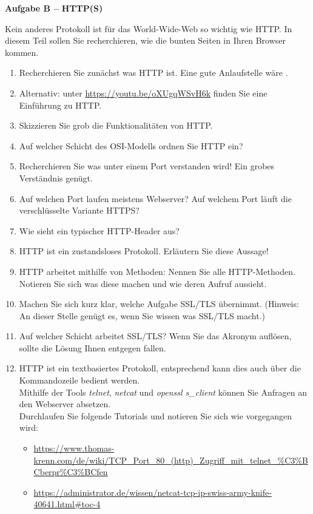 \documentclass[paper=a4,fontsize=11pt]{scrartcl}%
\numberwithin{equation}{section}
\begin{document}
\begin{center}\Large{\textbf{Aufgabe B -- HTTP(S)}}\end{center}\vskip0.25in
Kein anderes Protokoll ist für das World-Wide-Web so wichtig wie HTTP. In diesem Teil sollen Sie recherchieren, wie die bunten Seiten in Ihren Browser kommen.
\begin{enumerate}
	\item Recherchieren Sie zunächst was HTTP ist. Eine gute Anlaufstelle wäre \cite[S. 98ff]{Kurose2012}.
	\item Alternativ: unter \url{https://youtu.be/oXUgqWSvH6k} finden Sie eine Einführung zu HTTP.
	\item Skizzieren Sie grob die Funktionalitäten von HTTP.
	\item Auf welcher Schicht des OSI-Modells ordnen Sie HTTP ein?
	\item Recherchieren Sie was unter einem Port verstanden wird! Ein grobes Verständnis genügt.
	\item Auf welchen Port laufen meistens Webserver? Auf welchem Port läuft die verschlüsselte Variante HTTPS?
	\item Wie sieht ein typischer HTTP-Header aus?
	\item HTTP ist ein zustandsloses Protokoll. Erläutern Sie diese Aussage!
	\item HTTP arbeitet mithilfe von Methoden: Nennen Sie alle HTTP-Methoden. Notieren Sie sich was diese machen und wie deren Aufruf aussieht.
	\item Machen Sie sich kurz klar, welche Aufgabe SSL/TLS übernimmt. (Hinweis: An dieser Stelle genügt es, wenn Sie wissen was SSL/TLS macht.)
	\item Auf welcher Schicht arbeitet SSL/TLS? Wenn Sie das Akronym auflösen, sollte die Lösung Ihnen entgegen fallen.
	\item HTTP ist ein textbasiertes Protokoll, entsprechend kann dies auch über die Kommandozeile bedient werden.\\
	Mithilfe der Tools \emph{telnet}, \emph{netcat} und \emph{openssl s\_client} können Sie Anfragen an den Webserver absetzen.\\
	Durchlaufen Sie folgende Tutorials und notieren Sie sich wie vorgegangen wird:
	\begin{itemize}
		\item \url{https://www.thomas-krenn.com/de/wiki/TCP_Port_80_(http)_Zugriff_mit_telnet_%C3%BCberpr%C3%BCfen}
		\item \url{https://administrator.de/wissen/netcat-tcp-ip-swiss-army-knife-40641.html#toc-4}

\end{itemize}
\end{enumerate}
\end{document}
